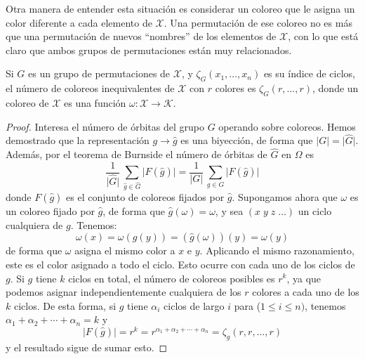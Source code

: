   Otra manera de entender esta situación
  es considerar un coloreo que le asigna un color diferente
  a cada elemento de \(\mathcal{X}\).
  Una permutación de ese coloreo
  no es más que una permutación
  de nuevos ``nombres'' de los elementos de \(\mathcal{X}\),
  con lo que está claro que ambos grupos de permutaciones
  están muy relacionados.

  \begin{theorem}
    \label{theo:coloreos}
    Si \(G\) es un grupo de permutaciones de \(\mathcal{X}\),
    y \(\zeta_G(x_1, \dotsc, x_n)\) es su índice de ciclos,
    el número de coloreos inequivalentes
    de \(\mathcal{X}\) con \(r\) colores
    es \(\zeta_G(r, \dotsc, r)\),
    donde un coloreo de \(\mathcal{X}\)
    es una función
      \(\omega \colon \mathcal{X} \rightarrow \mathcal{K}\).
  \end{theorem}
  \begin{proof}
    Interesa el número de órbitas del grupo \(G\)
    operando sobre coloreos.
    Hemos demostrado
    que la representación \(g \rightarrow \widehat{g}\)
    es una biyección,
    de forma que \(\lvert G \rvert = \lvert \widehat{G} \rvert\).
    Además,
    por el teorema de Burnside
    el número de órbitas de \(\widehat{G}\) en \(\Omega\) es
    \begin{equation*}
      \frac{1}{\lvert \widehat{G} \rvert} \,
	  \sum_{\widehat{g} \in \widehat{G}}
	    \lvert F(\widehat{g}) \rvert
	= \frac{1}{\lvert G \rvert} \,
	      \sum_{g \in G} \lvert F(\widehat{g}) \rvert
    \end{equation*}
    donde \(F(\widehat{g})\)
    es el conjunto de coloreos fijados por \(\widehat{g}\).
    Supongamos ahora que \(\omega\)
    es un coloreo fijado por \(\widehat{g}\),
    de forma que \(\widehat{g}(\omega) = \omega\),
    y sea \((x \; y \; z \; \dotso)\) un ciclo cualquiera de \(g\).
    Tenemos:
    \begin{equation*}
      \omega(x)
	= \omega(g(y))
	= (\widehat{g}(\omega))(y)
	= \omega(y)
    \end{equation*}
    de forma que \(\omega\) asigna el mismo color a \(x\) e \(y\).
    Aplicando el mismo razonamiento,
    este es el color asignado a todo el ciclo.
    Esto ocurre con cada uno de los ciclos de \(g\).
    Si \(g\) tiene \(k\) ciclos en total,
    el número de coloreos posibles es \(r^k\),
    ya que podemos asignar independientemente
    cualquiera de los \(r\) colores a cada uno de los \(k\) ciclos.
    De esta forma,
    si \(g\) tiene \(\alpha_i\) ciclos de largo \(i\)
    para (\(1 \le i \le n)\),
    tenemos \(\alpha_1 + \alpha_2 + \dotsb + \alpha_n = k\) y
    \begin{equation*}
      \lvert F(\widehat{g}) \rvert
	= r^k
	= r^{\alpha_1 + \alpha_2 + \dotsb + \alpha_n}
	= \zeta_g(r, r, \dotsc, r)
    \end{equation*}
    y el resultado sigue de sumar esto.
  \end{proof}

